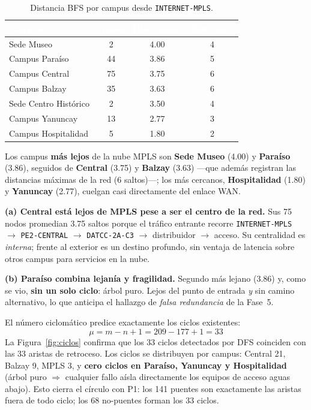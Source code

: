 \documentclass[11pt, a4paper]{article}
\newcommand{\encabezado}[1]{%
    \cellcolor{tabhead}\textcolor{white}{\textbf{#1}}}
\begin{document}
\begin{table}[htbp]
\centering
\caption{Distancia BFS por campus desde \texttt{INTERNET-MPLS}.}
\label{tab:bfs_mpls}
\small
\begin{tabular}{L{5cm} c c c}
    \toprule
    \encabezado{Campus} & \encabezado{Nodos} &
    \encabezado{Dist. media} & \encabezado{Dist. máx.} \\
    \midrule
    Sede Museo            & 2  & 4.00 & 4 \\
    Campus Paraíso        & 44 & 3.86 & 5 \\
    Campus Central        & 75 & 3.75 & 6 \\
    Campus Balzay         & 35 & 3.63 & 6 \\
    Sede Centro Histórico & 2  & 3.50 & 4 \\
    Campus Yanuncay       & 13 & 2.77 & 3 \\
    Campus Hospitalidad   & 5  & 1.80 & 2 \\
    \bottomrule
\end{tabular}
\end{table}

Los campus \textbf{más lejos} de la nube MPLS son \textbf{Sede Museo}
(4.00) y \textbf{Paraíso} (3.86), seguidos de \textbf{Central} (3.75) y
\textbf{Balzay} (3.63) —que además registran las distancias máximas de la
red (6 saltos)—; los más cercanos, \textbf{Hospitalidad} (1.80) y
\textbf{Yanuncay} (2.77), cuelgan casi directamente del enlace WAN.

\textbf{(a) Central está lejos de MPLS pese a ser el centro de la red.} Sus
75 nodos promedian 3.75 saltos porque el tráfico entrante recorre
\texttt{INTERNET-MPLS} $\to$ \texttt{PE2-CENTRAL} $\to$
\texttt{DATCC-2A-C3} $\to$ distribuidor $\to$ acceso. Su centralidad es
\textit{interna}; frente al exterior es un destino profundo, sin ventaja de
latencia sobre otros campus para servicios en la nube.

\textbf{(b) Paraíso combina lejanía y fragilidad.} Segundo más lejano
(3.86) y, como se vio, \textbf{sin un solo ciclo}: árbol puro. Lejos del
punto de entrada \textit{y} sin camino alternativo, lo que anticipa el
hallazgo de \textit{falsa redundancia} de la Fase~5.

El número ciclomático predice exactamente los ciclos existentes:
\[
  \mu = m - n + 1 = 209 - 177 + 1 = 33
\]
La Figura~\ref{fig:ciclos} confirma que los 33 ciclos detectados por DFS
coinciden con las 33 aristas de retroceso. Los ciclos se distribuyen por campus:
Central 21, Balzay 9, MPLS 3, y \textbf{cero ciclos en Paraíso, Yanuncay y
Hospitalidad} (árbol puro $\Rightarrow$ cualquier fallo aísla directamente los
equipos de acceso aguas abajo). Esto cierra el círculo con P1: los 141 puentes
son exactamente las aristas fuera de todo ciclo; los 68 no-puentes forman los
33 ciclos.
\end{document}
